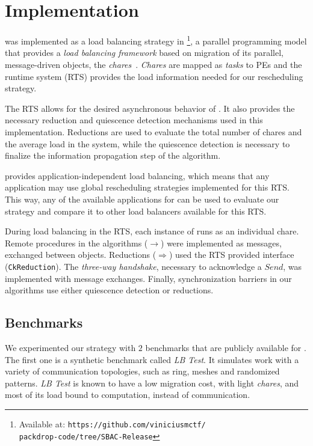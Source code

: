 \section{Implementation} \label{sec:impl}

\packdrop was implemented as a load balancing strategy in \charm\footnote{Available at: \texttt{https://github.com/viniciusmctf/\\packdrop-code/tree/SBAC-Release}}, a parallel programming model that provides a \textit{load balancing framework} based on migration of its parallel, message-driven objects, the \textit{chares}~\cite{CharmLOTR}.
\textit{Chares} are mapped as \textit{tasks} to PEs and the \charm runtime system (RTS) provides the load information needed for our rescheduling strategy.

The \charm RTS allows for the desired asynchronous behavior of \packdrop.
It also provides the necessary reduction and quiescence detection mechanisms used in this implementation.
Reductions are used to evaluate the total number of chares and the average load in the system, while the quiescence detection is necessary to finalize the information propagation step of the algorithm.

\charm provides application-independent load balancing, which means that any application may use global rescheduling strategies implemented for this RTS.
This way, any of the available applications for \charm can be used to evaluate our strategy and compare it to other load balancers available for this RTS.

During load balancing in the \charm RTS, each instance of \packdrop runs as an individual chare.
Remote procedures in the algorithms ($\rightarrow$) were implemented as messages, exchanged between objects.
Reductions ($\Rightarrow$) used the RTS provided interface ({\small\texttt{CkReduction}}).
The \textit{three-way handshake}, necessary to acknowledge a $Send$, was implemented with message exchanges.
Finally, synchronization barriers in our algorithms use either quiescence detection or reductions.

\subsection{Benchmarks} \label{sec:benchmarks}

We experimented our strategy with $2$ benchmarks that are publicly available for \charm.
The first one is a synthetic benchmark called \textit{LB Test}. 
It simulates work with a variety of communication topologies, such as ring, meshes and randomized patterns.
\textit{LB Test} is known to have a low migration cost, with light \textit{chares}, and most of its load bound to computation, instead of communication.

